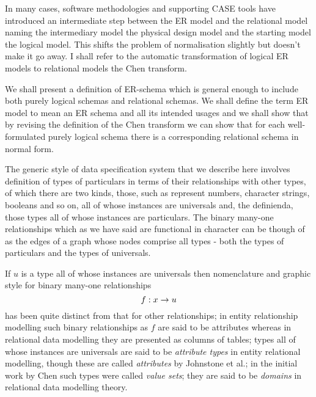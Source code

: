 In many cases, software methodologies and supporting CASE tools have introduced an intermediate step between the ER model and the relational model naming the intermediary model the physical design model and the starting model the logical
model. This shifts the problem of normalisation slightly but doesn't make it go away. I shall refer to the automatic transformation of logical ER models to relational models the Chen transform.  

We shall present a  definition of ER-schema which is general enough to include both purely logical schemas  and relational  schemas. We shall define the term ER model to mean an ER schema and all its intended usages and we shall show that by revising the definition of the Chen transform we can show that for each well-formulated purely logical schema there is a corresponding relational schema in normal form. 

\iffalse
The generic style of data specification system
that we describe here involves definition of types of particulars in terms of their relationships with other types,
of which there are two kinds, those, such as represent numbers, character strings, booleans and so on, all of
whose instances are universals and, the definienda, those types all of whose instances are particulars. The binary many-one relationships which as we have said are functional in character can be though of as the edges of a graph whose nodes comprise all types - both the types of particulars and the types of universals. 


If $u$ is a type all of whose instances are universals then 
nomenclature and graphic style for
binary many-one relationships
$$
f: x \rightarrow u
$$
 has been quite distinct from that for other relationships;
in entity relationship modelling such binary relationships as $f$
are said to be attributes whereas in relational data modelling they are presented as columns of tables; types all of whose instances are universals  are said to be \textit{attribute types} in entity relational 
modelling, though  these are called \textit{attributes} by Johnstone et al.; in the initial work by  Chen such types were called \textit{value sets}; they are said to be \textit{domains} in relational data modelling theory. 


